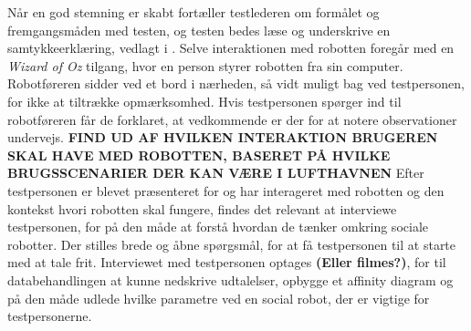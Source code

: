 Når en god stemning er skabt fortæller testlederen om formålet og fremgangsmåden med testen, og testen bedes læse og underskrive en samtykkeerklæring, vedlagt i .\blankline
%
Selve interaktionen med robotten foregår med en \textit{Wizard of Oz} tilgang, hvor en person styrer robotten fra sin computer. Robotføreren sidder ved et bord i nærheden, så vidt muligt bag ved testpersonen, for ikke at tiltrække opmærksomhed. Hvis testpersonen spørger ind til robotføreren får de forklaret, at vedkommende er der for at notere observationer undervejs. 
\textbf{FIND UD AF HVILKEN INTERAKTION BRUGEREN SKAL HAVE MED ROBOTTEN, BASERET PÅ HVILKE BRUGSSCENARIER DER KAN VÆRE I LUFTHAVNEN} \blankline
%
Efter testpersonen er blevet præsenteret for og har interageret med robotten og den kontekst hvori robotten skal fungere, findes det relevant at interviewe testpersonen, for på den måde at forstå hvordan de tænker omkring sociale robotter. Der stilles brede og åbne spørgsmål, for at få testpersonen til at starte med at tale frit. Interviewet med testpersonen optages \textbf{(Eller filmes?)}, for til databehandlingen at kunne nedskrive udtalelser, opbygge et affinity diagram og på den måde udlede hvilke parametre ved en social robot, der er vigtige for testpersonerne.
